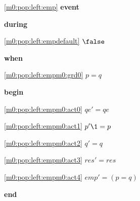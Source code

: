 \noindent \ref{m0:pop:left:emp}  \textbf{event}
\begin{block}
\item \textbf{during}
\begin{block}
\item[ \eqref{m0:pop:left:empdefault} ]$\false $ %
\end{block}
\item \textbf{when}
\begin{block}
\item[ \eqref{m0:pop:left:empm0:grd0} ]$p = q $ %
\end{block}
\item \textbf{begin}
\begin{block}
\item[ \eqref{m0:pop:left:empm0:act0} ]$qe' = qe $ %
\item[ \eqref{m0:pop:left:empm0:act1} ]$p' \1= p $ %
\item[ \eqref{m0:pop:left:empm0:act2} ]$q' = q $ %
\item[ \eqref{m0:pop:left:empm0:act3} ]$res' = res $ %
\item[ \eqref{m0:pop:left:empm0:act4} ]$emp' = (p = q) $ %
\end{block}
\item \textbf{end} \\
\end{block}
